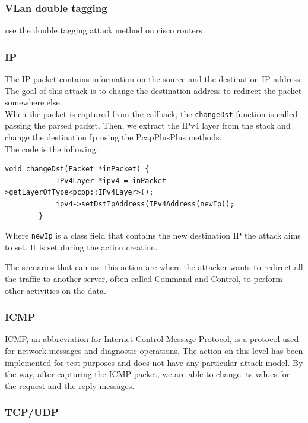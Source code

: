 \documentclass[12pt]{article}
\begin{document}
	\subsubsection{VLan double tagging}
	use the double tagging attack method on cisco routers


	\subsubsection{IP}
	The IP packet contains information on the source and the destination IP address. The goal of this attack is to change the destination address to redirect the packet somewhere else.\\
	When the packet is captured from the callback, the \lstinline{changeDst} function is called passing the parsed packet. Then, we extract the IPv4 layer from the stack and change the destination Ip using the PcapPlusPlus methods.\\
	The code is the following:
	\bigbreak

	\begin{lstlisting}[frame=single]
		void changeDst(Packet *inPacket) {
			IPv4Layer *ipv4 = inPacket->getLayerOfType<pcpp::IPv4Layer>();
			ipv4->setDstIpAddress(IPv4Address(newIp));
		}
	\end{lstlisting}
	\bigbreak

	Where \lstinline{newIp} is a class field that contains the new destination IP the attack aims to set. It is set during the action creation.

	\bigbreak
	The scenarios that can use this action are where the attacker wants to redirect all the traffic to another server, often called Command and Control, to perform other activities on the data.   
	
	\subsubsection{ICMP}
	ICMP, an abbreviation for Internet Control Message Protocol, is a protocol used for network messages and diagnostic operations. The action on this level has been implemented for test purposes and does not have any particular attack model. By the way, after capturing the ICMP packet, we are able to change its values for the request and the reply messages.

	\subsubsection{TCP/UDP}
	
\end{document}

